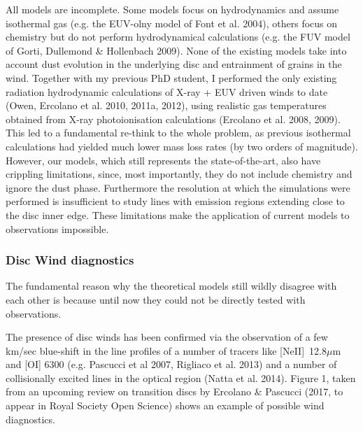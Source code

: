 \documentclass[10pt,fleqn,twoside]{article}
\begin{document}
All models are incomplete. Some models focus on hydrodynamics and
assume isothermal gas (e.g. the EUV-olny model of Font et al. 2004), others focus on
chemistry but do not perform hydrodynamical calculations (e.g. the FUV
model of Gorti,
Dullemond \& Hollenbach 2009). None of the existing models take into
account dust evolution in the underlying disc and entrainment of
grains in the wind. Together with my previous PhD student, I performed
the only existing radiation hydrodynamic calculations of X-ray  + EUV driven
winds to date (Owen, Ercolano et al. 2010, 2011a, 2012), using realistic gas
temperatures obtained from X-ray photoionisation calculations
(Ercolano et al. 2008, 2009). This led to a fundamental re-think to the
whole problem, as previous isothermal calculations had yielded much
lower mass loss rates (by two orders of magnitude). However, our
models, which still represents the state-of-the-art, also have
crippling limitations, since, most importantly, they do not include
chemistry and ignore the dust phase. Furthermore the resolution at
which the simulations were performed is insufficient to study lines with
emission regions extending close to the disc inner edge. These
limitations make the application of current models to observations
impossible.  

\subsubsection{Disc Wind diagnostics}

The fundamental reason why the theoretical models still wildly
disagree with each other is because until now they could not be
directly tested with observations.

The presence of disc winds has been confirmed via the
observation of a few km/sec blue-shift in the line profiles of a
number of tracers like [NeII]~12.8$\mu$m and [OI] 6300 (e.g. Pascucci
et al 2007, Rigliaco et al. 2013) and a number of collisionally excited lines in the optical
region (Natta et al. 2014). Figure 1, taken from an upcoming review on transition discs by
Ercolano \& Pascucci (2017, to appear in Royal Society Open Science)
shows an example of possible wind diagnostics.  

\end{document}
